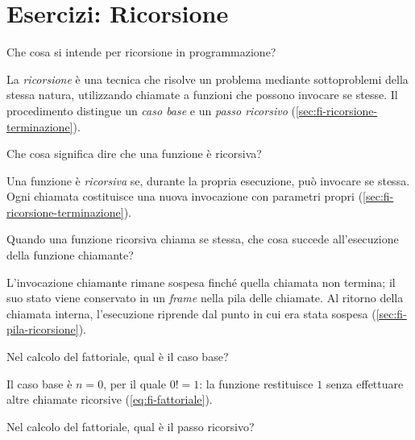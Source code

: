 \chapter{Esercizi: Ricorsione}
\label{chap:esercizi-ricorsione}

\begin{exercise}
\label{ex:fi-esercizi-ricorsione-significato}
Che cosa si intende per ricorsione in programmazione?
\end{exercise}

La \emph{ricorsione} è una tecnica che risolve un problema mediante
sottoproblemi della stessa natura, utilizzando chiamate a funzioni
che possono invocare se stesse. Il procedimento distingue un
\emph{caso base} e un \emph{passo ricorsivo}
(\cref{sec:fi-ricorsione-terminazione}).

\begin{exercise}
\label{ex:fi-esercizi-ricorsione-funzione}
Che cosa significa dire che una funzione è ricorsiva?
\end{exercise}

Una funzione è \emph{ricorsiva} se, durante la propria esecuzione,
può invocare se stessa.
Ogni chiamata costituisce una nuova invocazione con parametri propri
(\cref{sec:fi-ricorsione-terminazione}).

\begin{exercise}
\label{ex:fi-esercizi-ricorsione-chiamata}
Quando una funzione ricorsiva chiama se stessa, che cosa succede
all'esecuzione della funzione chiamante?
\end{exercise}

L'invocazione chiamante rimane sospesa finché quella chiamata non
termina; il suo stato viene conservato in un \emph{frame} nella
pila delle chiamate. Al ritorno della chiamata interna, l'esecuzione
riprende dal punto in cui era stata sospesa
(\cref{sec:fi-pila-ricorsione}).

\begin{exercise}
\label{ex:fi-esercizi-ricorsione-fattoriale-base}
Nel calcolo del fattoriale, qual è il caso base?
\end{exercise}

Il caso base è \(n=0\), per il quale \(0!=1\): la funzione
restituisce \(1\) senza effettuare altre chiamate ricorsive
(\cref{eq:fi-fattoriale}).

\begin{exercise}
\label{ex:fi-esercizi-ricorsione-fattoriale-passo}
Nel calcolo del fattoriale, qual è il passo ricorsivo?
\end{exercise}

